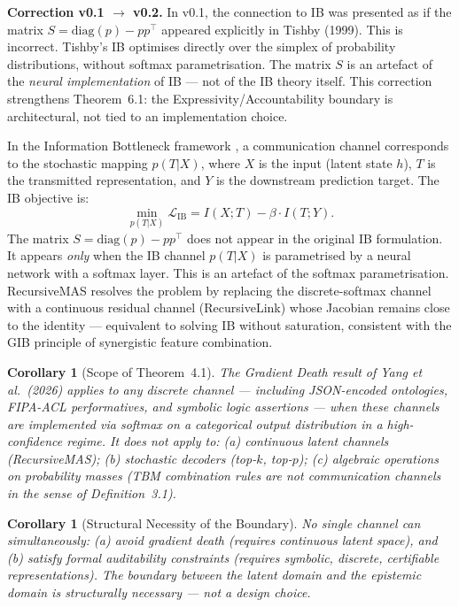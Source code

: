 \documentclass[11pt,a4paper]{article}
\theoremstyle{plain}
\newtheorem{corollary}[theorem]{Corollary}
\theoremstyle{definition}
\theoremstyle{remark}
\begin{document}
\begin{changebox}
\textbf{Correction v0.1 $\to$ v0.2.}
In v0.1, the connection to IB was presented as if the matrix
$S = \text{diag}(p) - pp^\top$ appeared explicitly in Tishby (1999). This is
incorrect. Tishby's IB optimises directly over the simplex of probability
distributions, without softmax parametrisation. The matrix $S$ is an artefact of
the \emph{neural implementation} of IB --- not of the IB theory itself. This
correction strengthens Theorem~6.1: the Expressivity/Accountability boundary is
architectural, not tied to an implementation choice.
\end{changebox}

In the Information Bottleneck framework \cite{tishby1999}, a communication channel
corresponds to the stochastic mapping $p(T|X)$, where $X$ is the input (latent
state $h$), $T$ is the transmitted representation, and $Y$ is the downstream
prediction target. The IB objective is:
\[
  \min_{p(T|X)} \mathcal{L}_\text{IB} = I(X;T) - \beta \cdot I(T;Y).
\]
The matrix $S = \text{diag}(p) - pp^\top$ does not appear in the original IB
formulation. It appears \emph{only} when the IB channel $p(T|X)$ is parametrised
by a neural network with a softmax layer. This is an artefact of the softmax
parametrisation. RecursiveMAS resolves the problem by replacing the
discrete-softmax channel with a continuous residual channel (RecursiveLink) whose
Jacobian remains close to the identity --- equivalent to solving IB without
saturation, consistent with the GIB principle \cite{westphal2025} of synergistic
feature combination.

\begin{corollary}[Scope of Theorem~4.1]
The Gradient Death result of Yang et al.\ (2026) applies to any discrete channel
--- including JSON-encoded ontologies, FIPA-ACL performatives, and symbolic logic
assertions --- when these channels are implemented via softmax on a categorical
output distribution in a high-confidence regime. It does \emph{not} apply to:
(a) continuous latent channels (RecursiveMAS); (b) stochastic decoders (top-$k$,
top-$p$); (c) algebraic operations on probability masses (TBM combination rules are
not communication channels in the sense of Definition~3.1).
\end{corollary}

\begin{corollary}[Structural Necessity of the Boundary]
No single channel can simultaneously: (a) avoid gradient death (requires continuous
latent space), and (b) satisfy formal auditability constraints (requires symbolic,
discrete, certifiable representations). The boundary between the latent domain and
the epistemic domain is structurally necessary --- not a design choice.
\end{corollary}
\end{document}
